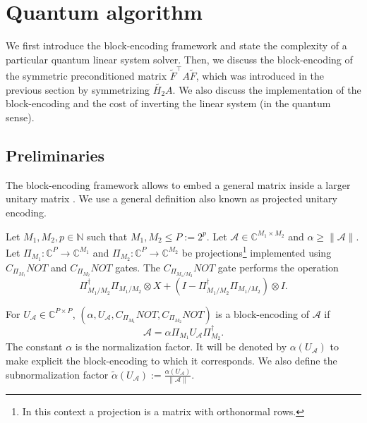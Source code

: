 \documentclass[onefignum,onetabnum]{siamart251216}
\newcommand{\Htwo}{H_2}
\newcommand{\Htwoap}{\widetilde{\Htwo}}
\renewcommand{\AA}{\mathcal{A}}
\begin{document}
\section{Quantum algorithm}
\label{sec:quantum}
We first introduce the block-encoding framework and state the complexity of a particular quantum linear system solver. Then, we discuss the block-encoding of the symmetric preconditioned matrix $\tilde{F}^\top A \tilde{F}$, which was introduced in the previous section by symmetrizing $\Htwoap A$. We also discuss the implementation of the block-encoding and the cost of inverting the linear system (in the quantum sense). 

\subsection{Preliminaries}
The block-encoding framework allows to embed a general matrix inside a larger unitary matrix \cite{Gily_n_2019}. We use a general definition \cite{Gily_n_2019, Deiml_2025} also known as projected unitary encoding.
\begin{definition}
Let $M_1,M_2,p \in \mathbb{N}$ such that $M_1, M_2 \leq P:=2^p$. Let $\AA \in \mathbb{C}^{M_1\times M_2}$ and $\alpha \geq \| \AA \|$. Let $\Pi_{M_1}:\mathbb{C}^{P} \rightarrow \mathbb{C}^{M_1}$ and $\Pi_{M_2}:\mathbb{C}^{P} \rightarrow \mathbb{C}^{M_2}$ be projections\footnote{In this context a projection is a matrix with orthonormal rows.} implemented using $C_{\Pi_{M_1}}NOT$ and $C_{\Pi_{M_2}}NOT$ gates. The $C_{\Pi_{M_1/M_2}}NOT$ gate performs the operation
\begin{equation*}
    \Pi_{M_1/M_2}^\dag\Pi_{M_1/M_2} \otimes X + (I-\Pi_{M_1/M_2}^\dag\Pi_{M_1/M_2} ) \otimes I.
\end{equation*}

For $U_{\AA} \in \mathbb{C}^{P \times P}$, $\left( \alpha, U_{\AA}, C_{\Pi_{M_1}}NOT, C_{\Pi_{M_2}}NOT \right)$ is a block-encoding of $\AA$ if 
\begin{equation*}
    \AA = \alpha \Pi_{M_1} U_\AA \Pi_{M_2}^{\dag}.
\end{equation*}
The constant $\alpha$ is the normalization factor. It will be denoted by ${\alpha}(U_{\AA})$ to make explicit the block-encoding to which it corresponds. We also define the subnormalization factor $\tilde{\alpha}(U_{\AA}) := \frac{\alpha(U_{\AA})}{\| \AA \|}$.
\end{definition}
\end{document}
